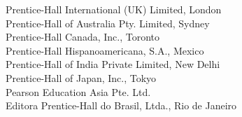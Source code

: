 \begin{flushleft}
{\ExampleSC
Prentice-Hall International (UK) Limited, London \\
Prentice-Hall of Australia Pty. Limited, Sydney \\
Prentice-Hall Canada, Inc., Toronto \\
Prentice-Hall Hispanoamericana, S.A., Mexico \\
Prentice-Hall of India Private Limited, New Delhi \\
Prentice-Hall of Japan, Inc., Tokyo \\
Pearson Education Asia Pte. Ltd. \\
Editora Prentice-Hall do Brasil, Ltda., Rio de Janeiro
}
\end{flushleft}

\vspace*{\fill}
\newpage
